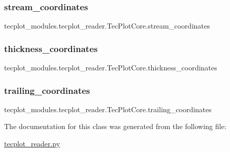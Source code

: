 \subsubsection{\texorpdfstring{stream\+\_\+coordinates}{stream\_coordinates}}
{\footnotesize\ttfamily tecplot\+\_\+modules.\+tecplot\+\_\+reader.\+Tec\+Plot\+Core.\+stream\+\_\+coordinates}

\hypertarget{classtecplot__modules_1_1tecplot__reader_1_1_tec_plot_core_a894f4ab5042e885fa8349c50c37059ac}{}\label{classtecplot__modules_1_1tecplot__reader_1_1_tec_plot_core_a894f4ab5042e885fa8349c50c37059ac} 
\subsubsection{\texorpdfstring{thickness\+\_\+coordinates}{thickness\_coordinates}}
{\footnotesize\ttfamily tecplot\+\_\+modules.\+tecplot\+\_\+reader.\+Tec\+Plot\+Core.\+thickness\+\_\+coordinates}

\hypertarget{classtecplot__modules_1_1tecplot__reader_1_1_tec_plot_core_ab6edfe4cfa33db98eb1414228f78a303}{}\label{classtecplot__modules_1_1tecplot__reader_1_1_tec_plot_core_ab6edfe4cfa33db98eb1414228f78a303} 
\subsubsection{\texorpdfstring{trailing\+\_\+coordinates}{trailing\_coordinates}}
{\footnotesize\ttfamily tecplot\+\_\+modules.\+tecplot\+\_\+reader.\+Tec\+Plot\+Core.\+trailing\+\_\+coordinates}



The documentation for this class was generated from the following file\+:\begin{DoxyCompactItemize}
\item 
\hyperlink{tecplot__reader_8py}{tecplot\+\_\+reader.\+py}\end{DoxyCompactItemize}
